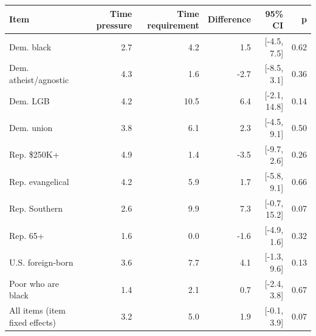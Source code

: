 
\begin{tabular}{lrrrrr}
\toprule
Item & Time pressure & Time requirement & Difference & 95\% CI & p\\
\midrule
Dem. black & 2.7 & 4.2 & 1.5 & {}[-4.5, 7.5] & 0.62\\
Dem. atheist/agnostic & 4.3 & 1.6 & -2.7 & {}[-8.5, 3.1] & 0.36\\
Dem. LGB & 4.2 & 10.5 & 6.4 & {}[-2.1, 14.8] & 0.14\\
Dem. union & 3.8 & 6.1 & 2.3 & {}[-4.5, 9.1] & 0.50\\
Rep. \$250K+ & 4.9 & 1.4 & -3.5 & {}[-9.7, 2.6] & 0.26\\
Rep. evangelical & 4.2 & 5.9 & 1.7 & {}[-5.8, 9.1] & 0.66\\
Rep. Southern & 2.6 & 9.9 & 7.3 & {}[-0.7, 15.2] & 0.07\\
Rep. 65+ & 1.6 & 0.0 & -1.6 & {}[-4.9, 1.6] & 0.32\\
U.S. foreign-born & 3.6 & 7.7 & 4.1 & {}[-1.3, 9.6] & 0.13\\
Poor who are black & 1.4 & 2.1 & 0.7 & {}[-2.4, 3.8] & 0.67\\
All items (item fixed effects) & 3.2 & 5.0 & 1.9 & {}[-0.1, 3.9] & 0.07\\
\bottomrule
\end{tabular}
